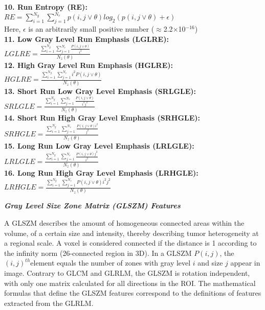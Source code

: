 \textbf{10. Run Entropy (RE):}\\
$RE =\sum _{i=1}^{N_{g}}\sum _{j=1}^{N_{r}}p\left(i,j\vee \theta \right)log_{2}\left(p\left(i,j\vee \theta \right)+\epsilon \right)$\\
Here, $\epsilon $ is an arbitrarily small positive number (${\approx}$2.2${\times}$10$^{-16}$)\\
\textbf{11. Low Gray Level Run Emphasis (LGLRE):}\\
$\textit{LGLRE}=\frac{\sum _{i=1}^{N_{g}}\sum _{j=1}^{N_{r}}\frac{P\left(i,j\vee \theta \right)}{i^{2}}}{N_{z}\left(\theta \right)}$\\
\textbf{12. High Gray Level Run Emphasis (HGLRE):}\\
$\textit{HGLRE}=\frac{\sum _{i=1}^{N_{g}}\sum _{j=1}^{N_{r}}i^{2}P\left(i,j\vee \theta \right)}{N_{z}\left(\theta \right)}$\\
\textbf{13. Short Run Low Gray Level Emphasis (SRLGLE):}\\
$\textit{SRLGLE}=\frac{\sum _{i=1}^{N_{g}}\sum _{j=1}^{N_{r}}\frac{P\left(i,j\vee \theta \right)}{i^{2}j^{2}}}{N_{z}\left(\theta \right)}$\\
\textbf{14. Short Run High Gray Level Emphasis (SRHGLE):}\\
$\textit{SRHGLE}=\frac{\sum _{i=1}^{N_{g}}\sum _{j=1}^{N_{r}}\frac{P\left(i,j\vee \theta \right)i^{2}}{j^{2}}}{N_{z}\left(\theta \right)}$\\
\textbf{15. Long Run Low Gray Level Emphasis (LRLGLE):}\\
$\textit{LRLGLE}=\frac{\sum _{i=1}^{N_{g}}\sum _{j=1}^{N_{r}}\frac{P\left(i,j\vee \theta \right)j^{2}}{i^{2}}}{N_{z}\left(\theta \right)}$\\
\textbf{16. Long Run High Gray Level Emphasis (LRHGLE):}\\
$\textit{LRHGLE}=\frac{\sum _{i=1}^{N_{g}}\sum _{j=1}^{N_{r}}P\left(i,j\vee \theta \right)i^{2}j^{2}}{N_{z}\left(\theta \right)}$

\textbf{\textit{Gray Level Size Zone Matrix (GLSZM) Features}}

A GLSZM describes the amount of homogeneous connected areas within the volume, of a certain size and intensity, thereby describing tumor heterogeneity at a regional scale. A voxel is considered connected if the distance is 1 according to the infinity norm (26-connected region in 3D). In a GLSZM $P\left(i,j\right)$, the $\left(i,j\right)^{th}$element equals the number of zones with gray level $i$ and size $j$ appear in image. Contrary to GLCM and GLRLM, the GLSZM is rotation independent, with only one matrix calculated for all directions in the ROI. The mathematical formulas that define the GLSZM features correspond to the definitions of features extracted from the GLRLM.

